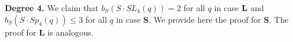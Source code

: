 {\bf Degree 4.} We claim that $b_S(S \cdot SL_4(q))=2$ for all $q$ in case ${\bf L}$ and $b_S(S \cdot Sp_4(q))\le 3$ for all $q$ in case {\bf S}. We provide here the proof for  {\bf S}. The proof for {\bf L} is  analogous. 
\begin{comment}
 By Lemma \ref{suplem}, $S$ contains the unique maximal abelian normal subgroup $A$ such that $A$ is the multiplicative group of an extension field $K$ of the field of scalar matrices $\Delta$ and $m=|K:\Delta|$ divides $n$.  If $m=1$, then, by Lemma \ref{suplem}, $S/Z(GL_4(q))$ lies in the absolutely irreducible subgroup isomorphic to $2^4.Sp(4,2)$ and such a subgroup exists only if $q$ is odd. By \cite[Table 2]{burness}, $b_S(GL_4(q))=2$ in this case. %

Let $m\ge 2.$ Therefore, $S$ lies in either in $GL_2(q^2).2$ or in $GL_1(q^4).4$.  

If $q$ is even then $m=4$ by \cite[\S 20, Corollary 3.1]{sup} and $S=T \rtimes \langle \phi \rangle$ is the normaliser of a Singer cycle $T$. Therefore, $|S|=|T||\langle \phi \rangle|$, where $|T|=q^4-1$ and $|\langle \phi \rangle|=4$, so $\langle \phi \rangle$ is a $2$-Sylow subgroup of $S$ and it contains only one element of order $2$. 

  Let $G=PGL_4(q)$ and let $H$ be the image of $S$ in $G$ under the natural homomorphism. In this case 
 we claim  that $Q(G,2)<1$ in \eqref{ver}.  
Let $x \in G$ have  prime order. Denote by $k_{s,r,u}$ and $k_{s,r,s}$ the numbers of conjugate classes of unipotent and semisimple elements of prime order $r$ in $G$ such that $\nu(x)=s$ respectively. By \cite[Propositions 3.24 and 3.40]{fpr2}
\begin{equation}\label{40}
\begin{split}
k_{s,p,u}&\le p^{s/2};\\
k_{s,r,s} &\le 
\left\{ 
\begin{split}
q^s, \text{ if } s<n/2;\\
q^{s+1}, \text{ otherwise}.
\end{split}
\right.
\end{split}
\end{equation}

 If $r \ne 2$, then
\begin{equation} \label{41}
 |x^G \cap H|\le 4
\end{equation}
 by  Lemma \ref{sin} and 
\begin{equation}\label{42}
|x^G|>
\left\{ 
\begin{split}
&q^{2s(n-s)}/2,& \text{ if } s<n/2;\\
&q^{ns}/2, & \text{ otherwise}
\end{split}
\right.
\end{equation}
by \cite[Lemma 3.34 and Proposition 3.36 ]{fpr2}.



\end{comment}
